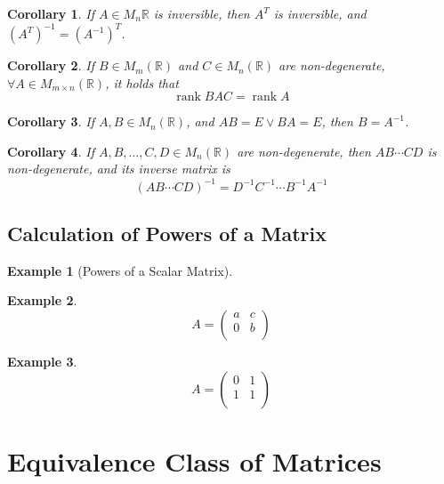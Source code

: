 \documentclass[onecolumn]{ctexart}
\newtheorem{corollary}{Corollary}
\newtheorem{example}{Example}
\DeclareMathOperator{\rank}{rank}
\begin{document}
\begin{corollary}
  If $A \in M_n{\mathbb{R}}$ is inversible, then $A^T$ is inversible, and 
  $(A^T)^{-1} = (A^{-1})^T$.
\end{corollary}

\begin{corollary}
  If $B \in M_m(\mathbb{R})$ and $C \in M_n(\mathbb{R})$ are non-degenerate, 
  $\forall A \in M_{m \times n}(\mathbb{R})$, it holds that
  \[
    \rank BAC = \rank A
  \]
\end{corollary}

\begin{corollary}
  If $A, B \in M_n(\mathbb{R})$, and $AB = E \vee BA = E$, then $B = A^{-1}$.
\end{corollary}

\begin{corollary}
  If $A, B, \ldots, C, D \in M_n(\mathbb{R})$ are non-degenerate, then 
  $AB \cdots CD$ is non-degenerate, and its inverse matrix is
  \[
    (AB \cdots CD)^{-1} = D^{-1} C^{-1} \cdots B^{-1} A^{-1}
  \]
\end{corollary}

\subsection{Calculation of Powers of a Matrix}

\begin{example}[Powers of a Scalar Matrix]
  
\end{example}

\begin{example}
  \[
    A = 
    \begin{pmatrix}
      a & c \\
      0 & b \\
    \end{pmatrix}
  \]
\end{example}

\begin{example}
  \[
    A = 
    \begin{pmatrix}
      0 & 1 \\
      1 & 1 \\
    \end{pmatrix}
  \]
\end{example}

\section{Equivalence Class of Matrices}
\end{document}
